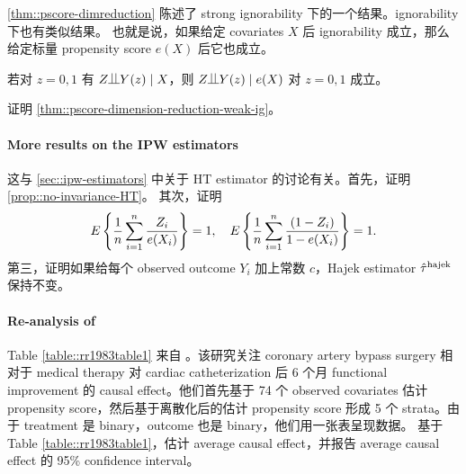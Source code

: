 \cref{thm::pscore-dimreduction} 陈述了 strong ignorability 下的一个结果。ignorability 下也有类似结果。
也就是说，如果给定 covariates $X$ 后 ignorability 成立，那么给定标量 propensity score $e(X)$ 后它也成立。

\begin{theorem}
\label{thm::pscore-dimension-reduction-weak-ig}
若对 $z=0,1$ 有 $Z\ind Y(z)  \mid X$，则
$
Z\ind Y(z)\mid e(X)
$
对 $z=0,1$ 成立。
\end{theorem} 


证明 \cref{thm::pscore-dimension-reduction-weak-ig}。



 
 \paragraph{More results on the IPW estimators}
\label{hw::hajek-weights} 
 
这与 \cref{sec::ipw-estimators} 中关于 HT estimator 的讨论有关。首先，证明 \cref{prop::no-invariance-HT}。
其次，证明
 \begin{eqnarray*} 
E\left\{ \frac{1}{n} \sum_{i=1}^n \frac{Z_i }{e(X_i) } \right\} =1,\quad
E\left\{  \frac{1}{n} \sum_{i=1}^n \frac{ (1-Z_i) }{ 1 - e(X_i) }  \right\} = 1.
\end{eqnarray*}
第三，证明如果给每个 observed outcome $Y_i$ 加上常数 $c$，Hajek estimator
$
\hat{\tau}^\textup{hajek} 
$
保持不变。


\paragraph{Re-analysis of \citet{Rosenbaum::1983JRSSB}}



Table \cref{table::rr1983table1} 来自 \citet{Rosenbaum::1983JRSSB}。该研究关注 coronary artery bypass surgery 相对于 medical therapy 对 cardiac catheterization 后 6 个月 functional improvement 的 causal effect。他们首先基于 74 个 observed covariates 估计 propensity score，然后基于离散化后的估计 propensity score 形成 5 个 strata。由于 treatment 是 binary，outcome 也是 binary，他们用一张表呈现数据。
基于 Table \cref{table::rr1983table1}，估计 average causal effect，并报告 average causal effect 的 95\% confidence interval。



